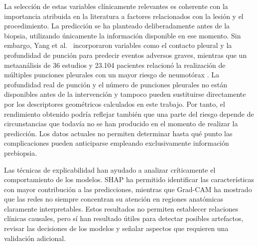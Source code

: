 
La selección de estas variables clínicamente relevantes es coherente con la importancia atribuida en la literatura a factores relacionados con la lesión y el procedimiento. La predicción se ha planteado deliberadamente antes de la biopsia, utilizando únicamente la información disponible en ese momento. Sin embargo, Yang et al.~\cite{yang2026machine} incorporaron variables como el contacto pleural y la profundidad de punción para predecir eventos adversos graves, mientras que un metaanálisis de 36 estudios y 23.104 pacientes relacionó la realización de múltiples punciones pleurales con un mayor riesgo de neumotórax \cite{Huo2020Pneumothorax}. La profundidad real de punción y el número de punciones pleurales no están disponibles antes de la intervención y tampoco pueden sustituirse directamente por los descriptores geométricos calculados en este trabajo. Por tanto, el rendimiento obtenido podría reflejar también que una parte del riesgo depende de circunstancias que todavía no se han producido en el momento de realizar la predicción. Los datos actuales no permiten determinar hasta qué punto las complicaciones pueden anticiparse empleando exclusivamente información prebiopsia.

Las técnicas de explicabilidad han ayudado a analizar críticamente el comportamiento de los modelos. SHAP ha permitido identificar las características con mayor contribución a las predicciones, mientras que Grad-CAM ha mostrado que las redes no siempre concentran su atención en regiones anatómicas claramente interpretables. Estos resultados no permiten establecer relaciones clínicas causales, pero sí han resultado útiles para detectar posibles artefactos, revisar las decisiones de los modelos y señalar aspectos que requieren una validación adicional.

